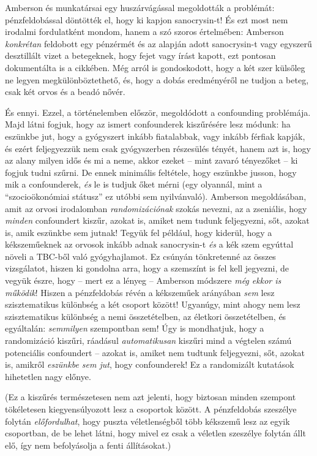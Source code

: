 \documentclass[magyar,]{book}
\begin{document}
Amberson és munkatársai egy huszárvágással megoldották a problémát: pénzfeldobással döntötték el, hogy ki kapjon sanocrysin-t! És ezt most nem irodalmi fordulatként mondom, hanem a szó szoros értelmében: Amberson \emph{konkrétan} feldobott egy pénzérmét és az alapján adott sanocrysin-t vagy egyszerű desztillált vizet a betegeknek, hogy fejet vagy írást kapott, ezt pontosan dokumentálta is a cikkében. Még arról is gondoskodott, hogy a két szer külsőleg ne legyen megkülönböztethető, és, hogy a dobás eredményéről ne tudjon a beteg, csak két orvos és a beadó nővér.

És ennyi. Ezzel, a történelemben először, megoldódott a confounding problémája. Majd látni fogjuk, hogy az ismert confounderek kiszűrésére lesz módunk: ha eszünkbe jut, hogy a gyógyszert inkább fiatalabbak, vagy inkább férfiak kapják, és ezért feljegyezzük nem csak gyógyszerben részesülés tényét, hanem azt is, hogy az alany milyen idős és mi a neme, akkor ezeket -- mint zavaró tényezőket -- ki fogjuk tudni szűrni. De ennek minimális feltétele, hogy eszünkbe jusson, hogy mik a confounderek, \emph{és} le is tudjuk őket mérni (egy olyannál, mint a \enquote{szocioökonómiai státusz} ez utóbbi sem nyilvánvaló). Amberson megoldásában, amit az orvosi irodalomban \emph{randomizációnak} szokás nevezni, az a zseniális, hogy \emph{minden} confoundert kiszűr, azokat is, amiket nem tudunk feljegyezni, sőt, azokat is, amik eszünkbe sem jutnak! Tegyük fel például, hogy kiderül, hogy a kékszeműeknek az orvosok inkább adnak sanocrysin-t \emph{és} a kék szem egyúttal növeli a TBC-ből való gyógyhajlamot. Ez csúnyán tönkretenné az összes vizsgálatot, hiszen ki gondolna arra, hogy a szemszínt is fel kell jegyezni, de vegyük észre, hogy -- mert ez a lényeg -- Amberson módszere \emph{még ekkor is működik}! Hiszen a pénzfeldobás révén a kékszeműek arányában \emph{sem} lesz szisztematikus különbség a két csoport között! Ugyanúgy, mint ahogy nem lesz szisztematikus különbség a nemi összetételben, az életkori összetételben, és egyáltalán: \emph{semmilyen} szempontban sem! Úgy is mondhatjuk, hogy a randomizáció kiszűri, ráadásul \emph{automatikusan} kiszűri mind a végtelen számú potenciális confoundert -- azokat is, amiket nem tudtunk feljegyezni, sőt, azokat is, amikről \emph{eszünkbe sem jut}, hogy confounderek! Ez a randomizált kutatások hihetetlen nagy előnye.

(Ez a kiszűrés természetesen nem azt jelenti, hogy biztosan minden szempont tökéletesen kiegyensúlyozott lesz a csoportok között. A pénzfeldobás szeszélye folytán \emph{előfordulhat}, hogy puszta véletlenségből több kékszemű lesz az egyik csoportban, de be lehet látni, hogy mivel ez csak a véletlen szeszélye folytán állt elő, így nem befolyásolja a fenti állításokat.)
\end{document}

